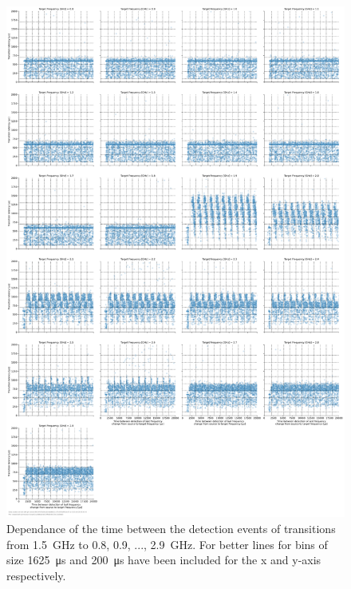 \begin{figure}[]
    \centering
    \includegraphics[width=\columnwidth]{fig/ftalat/ftalat_scatter_wait_transition_latency_hati_source_1.5.pdf}
    \caption{Dependance of the time between the detection events of transitions from \SI{1.5}{\GHz} to \SI{0.8}{}, \SI{0.9}{}, ..., \SI{2.9}{\GHz}. For better lines for bins of size \SI{1625}{\us} and \SI{200}{\us} have been included for the x and y-axis respectively.}
\end{figure}
